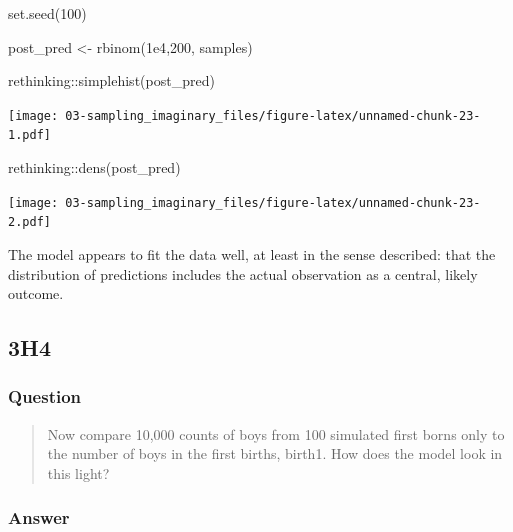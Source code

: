 \documentclass[
]{book}
\newenvironment{Shaded}{\begin{snugshade}}{\end{snugshade}}
\newcommand{\DecValTok}[1]{\textcolor[rgb]{0.00,0.00,0.81}{#1}}
\newcommand{\FloatTok}[1]{\textcolor[rgb]{0.00,0.00,0.81}{#1}}
\newcommand{\FunctionTok}[1]{\textcolor[rgb]{0.00,0.00,0.00}{#1}}
\newcommand{\NormalTok}[1]{#1}
\newcommand{\OtherTok}[1]{\textcolor[rgb]{0.56,0.35,0.01}{#1}}
\newcommand{\SpecialCharTok}[1]{\textcolor[rgb]{0.00,0.00,0.00}{#1}}
\begin{document}
\begin{Shaded}
\begin{Highlighting}[]
\FunctionTok{set.seed}\NormalTok{(}\DecValTok{100}\NormalTok{)}

\NormalTok{post\_pred }\OtherTok{\textless{}{-}} \FunctionTok{rbinom}\NormalTok{(}\FloatTok{1e4}\NormalTok{,}\DecValTok{200}\NormalTok{, samples)}

\NormalTok{rethinking}\SpecialCharTok{::}\FunctionTok{simplehist}\NormalTok{(post\_pred)}
\end{Highlighting}
\end{Shaded}

\texttt{[image: 03-sampling\_imaginary\_files/figure-latex/unnamed-chunk-23-1.pdf]}

\begin{Shaded}
\begin{Highlighting}[]
\NormalTok{rethinking}\SpecialCharTok{::}\FunctionTok{dens}\NormalTok{(post\_pred)}
\end{Highlighting}
\end{Shaded}

\texttt{[image: 03-sampling\_imaginary\_files/figure-latex/unnamed-chunk-23-2.pdf]}

The model appears to fit the data well, at least in the sense described: that the distribution of predictions includes the actual observation as a central, likely outcome.

\hypertarget{h4-1}{%
\subsection*{3H4}\label{h4-1}}

\hypertarget{question-31}{%
\subsubsection*{Question}\label{question-31}}

\begin{quote}
Now compare 10,000 counts of boys from 100 simulated first borns only to the number of boys in the first births, birth1. How does the model look in this light?
\end{quote}

\hypertarget{answer-31}{%
\subsubsection*{Answer}\label{answer-31}}
\end{document}
